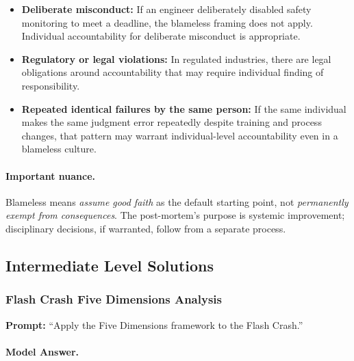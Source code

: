 \begin{itemize}
    \item \textbf{Deliberate misconduct:} If an engineer deliberately disabled safety monitoring to meet a deadline, the blameless framing does not apply. Individual accountability for deliberate misconduct is appropriate.
    \item \textbf{Regulatory or legal violations:} In regulated industries, there are legal obligations around accountability that may require individual finding of responsibility.
    \item \textbf{Repeated identical failures by the same person:} If the same individual makes the same judgment error repeatedly despite training and process changes, that pattern may warrant individual-level accountability even in a blameless culture.
\end{itemize}

\paragraph{Important nuance.}

Blameless means \emph{assume good faith} as the default starting point, not \emph{permanently exempt from consequences}. The post-mortem's purpose is systemic improvement; disciplinary decisions, if warranted, follow from a separate process.

\subsection{Intermediate Level Solutions}

\subsubsection{Flash Crash Five Dimensions Analysis}

\textbf{Prompt:} ``Apply the Five Dimensions framework to the Flash Crash.''

\paragraph{Model Answer.}

